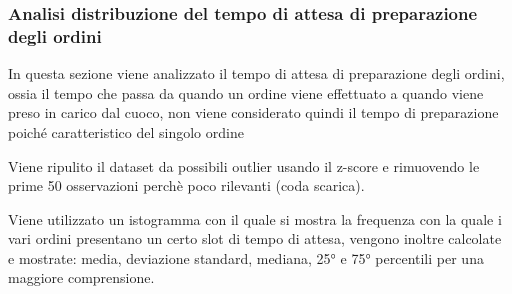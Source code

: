 \subsubsection{Analisi distribuzione del tempo di attesa di preparazione degli ordini}
In questa sezione viene analizzato il tempo di attesa di preparazione degli ordini, ossia il tempo che passa da quando un ordine viene effettuato a quando viene preso in carico dal cuoco, non viene considerato quindi il tempo di preparazione poiché caratteristico del singolo ordine

Viene ripulito il dataset da possibili outlier usando il z-score e rimuovendo le prime 50 osservazioni perchè poco rilevanti (coda scarica).

Viene utilizzato un istogramma con il quale si mostra la frequenza con la quale i vari ordini presentano un certo slot di tempo di attesa, 
vengono inoltre calcolate e mostrate: media, deviazione standard, mediana, 25° e 75° percentili per una maggiore comprensione.

